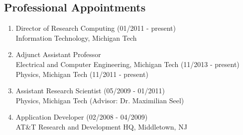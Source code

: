 %
\subsection*{Professional Appointments} 

\begin{enumerate}
  \item \textsf{Director of Research Computing}
        (01/2011 - present)\\
        Information Technology, Michigan Tech

  \item \textsf{Adjunct Assistant Professor}\\
        Electrical and Computer Engineering, Michigan Tech (11/2013 - present)\\
        Physics, Michigan Tech (11/2011 - present)

  \item \textsf{Assistant Research Scientist} (05/2009 - 01/2011)\\
        Physics, Michigan Tech (Advisor: Dr. Maximilian Seel)

  \item \textsf{Application Developer} (02/2008 - 04/2009)\\
        AT\&T Research and Development HQ, Middletown, NJ
\end{enumerate}
